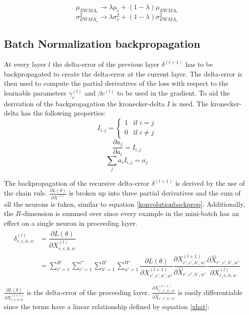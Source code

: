 \documentclass[a4paper, twoside]{article}
\newcommand*{\pd}[2]{\ensuremath{\dfrac{\partial #1}{\partial #2}}}
\newcommand*{\inpd}[2]{\ensuremath{\frac{\partial #1}{\partial #2}}}
\begin{document}
\begin{equation}\label{eqewmamu}
\mu_{EWMA_c} \to \lambda \mu_c + (1-\lambda)\mu_{EWMA_c}
\end{equation}
\begin{equation}\label{eqewmasigma}
\sigma^2_{EWMA_c} \to \lambda \sigma^2_c + (1-\lambda)\sigma^2_{EWMA_c}
\end{equation}

\subsection{Batch Normalization backpropagation}
At every layer $l$ the delta-error of the previous layer $\delta^{(l+1)}$ has to be backpropagated to create the delta-error at the current layer. The delta-error is then used to compute the partial derivatives of the loss with respect to the learnable parameters $\gamma_{c}^{(l)}$ and $\beta{c}^{(l)}$ to be used in the gradient. To aid the derivation of the backpropagation the kronecker-delta $I$ is used. The kronecker-delta has the following properties: \cite{webBN1} \cite{webBN2}
\begin{equation}\label{kroneckerdelta}
I_{i,j} = \begin{cases} 1 & \mbox{if } i = j \\ 0 & \mbox{if } i \neq j  \end{cases}
\end{equation}
\begin{equation}\label{kroneckerdeltaDERIVATIVE}
\pd{a_{j}}{a_i} = I_{i,j}
\end{equation}
\begin{equation}\label{kroneckerdeltaSUM}
\sum_j  a_i  I_{i,j} = a_j
\end{equation}

The backpropagation of the recursive delta-error $\delta^{(l+1)}$ is derived by the use of the chain rule. $\inpd{L(\theta)}{X^{(l)}}$ is broken up into three partial derivatives and the sum of all the neurons is taken, similar to equation \eqref{konvolutionbackprop}. Additionally, the $R$-dimension is summed over since every example in the mini-batch has an effect on a single neuron in proceeding layer. \cite{webBN1} \cite{webBN2}
\begin{align}\label{BN_delta_error}
\begin{split}
	\delta^{(l)}_{r,c,h,w}
		& = \pd{L(\theta)}{X^{(l)}_{r,c,h,w}} \\
		& = \sum^{R' }_{r'=1} \sum^{C' }_{c'=1} \sum^{H' }_{h'=1} \sum^{W' }_{w'=1} \pd{L(\theta)}{X^{(l+1)}_{r',c',h',w'}} \pd{X^{(l+1)}_{r',c',h',w'}}{\hat{X}_{r',c',h',w'}} \pd{\hat{X}_{r',c',h',w'}}{{X}^{(l)}_{r,c,h,w}}\\
\end{split}
\end{align}
$\inpd{L(\theta)}{X^{(l+1)}_{r,c,h,w}}$ is the delta-error of the proceeding layer. $\inpd{X^{(l+1)}_{r',c',h',w'}}{\hat{X}_{r',c',h',w'}}$ is easily differentiable since the terms have a linear relationship defined by equation \eqref{xhat}: \cite{webBN1} \cite{webBN2}
\end{document}
